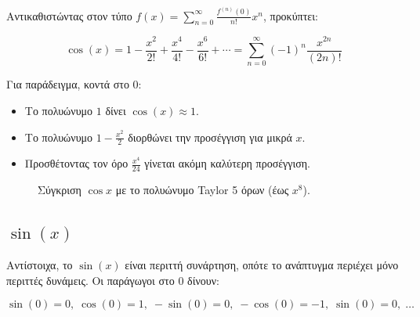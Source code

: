 \documentclass[
  a4paper,
  11pt,
]{article}
\begin{document}
Αντικαθιστώντας στον τύπο
\(f(x)=\sum_{n=0}^{\infty} \frac{f^{(n)}(0)}{n!}x^n\), προκύπτει:

\[
\cos(x) = 1 - \frac{x^2}{2!} + \frac{x^4}{4!} - \frac{x^6}{6!} + \cdots = \sum_{n=0}^{\infty} (-1)^n \frac{x^{2n}}{(2n)!}
\]

Για παράδειγμα, κοντά στο \(0\):

\begin{itemize}
\item
  Το πολυώνυμο \(1\) δίνει \(\cos(x)\approx 1\).
\item
  Το πολυώνυμο \(1 - \frac{x^2}{2}\) διορθώνει την προσέγγιση για μικρά
  \(x\).
\item
  Προσθέτοντας τον όρο \(\frac{x^4}{24}\) γίνεται ακόμη καλύτερη
  προσέγγιση.
\end{itemize}

\begin{figure}[htbp]
\centering
{}
\caption{Σύγκριση $\cos x$ με το πολυώνυμο Taylor 5 όρων (έως $x^8$).}
\label{fig:costaylor5}
\par
\end{figure}

\subsection{\texorpdfstring{\(\sin(x)\)}{\textbackslash sin(x)}}\label{sinx}

Αντίστοιχα, το \(\sin(x)\) είναι περιττή συνάρτηση, οπότε το ανάπτυγμα
περιέχει μόνο περιττές δυνάμεις. Οι παράγωγοι στο \(0\) δίνουν:

\[
\sin(0)=0,\; \cos(0)=1,\; -\sin(0)=0,\; -\cos(0)=-1,\; \sin(0)=0,\; \dots
\]
\end{document}
